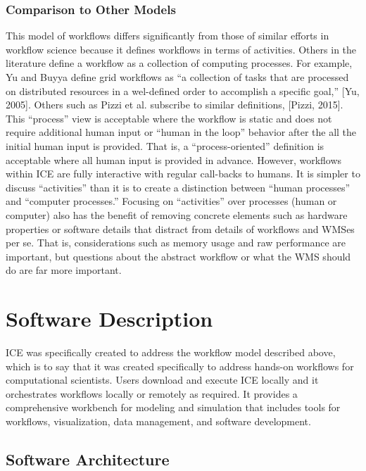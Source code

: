 \subsubsection{Comparison to Other
Models}\label{comparison-to-other-models}

This model of workflows differs significantly from those of similar
efforts in workflow science because it defines workflows in terms of
activities. Others in the literature define a workflow as a collection
of computing processes. For example, Yu and Buyya define grid workflows
as ``a collection of tasks that are processed on distributed resources
in a wel-defined order to accomplish a specific goal,'' {[}Yu, 2005{]}.
Others such as Pizzi et al. subscribe to similar definitions, {[}Pizzi,
2015{]}. This ``process'' view is acceptable where the workflow is
static and does not require additional human input or ``human in the
loop'' behavior after the all the initial human input is provided. That
is, a ``process-oriented'' definition is acceptable where all human
input is provided in advance. However, workflows within ICE are fully
interactive with regular call-backs to humans. It is simpler to discuss
``activities'' than it is to create a distinction between ``human
processes'' and ``computer processes.'' Focusing on ``activities'' over
processes (human or computer) also has the benefit of removing concrete
elements such as hardware properties or software details that distract
from details of workflows and WMSes per se. That is, considerations such
as memory usage and raw performance are important, but questions about
the abstract workflow or what the WMS should do are far more important.

\section{Software Description}\label{software-description}

ICE was specifically created to address the workflow model described
above, which is to say that it was created specifically to address
hands-on workflows for computational scientists. Users download and
execute ICE locally and it orchestrates workflows locally or remotely as
required. It provides a comprehensive workbench for modeling and
simulation that includes tools for workflows, visualization, data
management, and software development.

\subsection{Software Architecture}\label{software-architecture}

